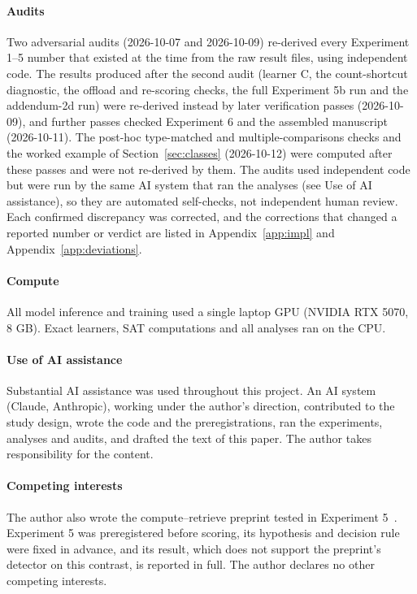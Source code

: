 \documentclass[11pt]{article}
\begin{document}
\paragraph{Audits}

Two adversarial audits (2026-10-07 and 2026-10-09) re-derived every Experiment 1--5 number that existed at the time from the raw result files, using independent code. The results produced after the second audit (learner C, the count-shortcut diagnostic, the offload and re-scoring checks, the full Experiment 5b run and the addendum-2d run) were re-derived instead by later verification passes (2026-10-09), and further passes checked Experiment 6 and the assembled manuscript (2026-10-11). The post-hoc type-matched and multiple-comparisons checks and the worked example of Section~\ref{sec:classes} (2026-10-12) were computed after these passes and were not re-derived by them. The audits used independent code but were run by the same AI system that ran the analyses (see Use of AI assistance), so they are automated self-checks, not independent human review. Each confirmed discrepancy was corrected, and the corrections that changed a reported number or verdict are listed in Appendix~\ref{app:impl} and Appendix~\ref{app:deviations}.

\paragraph{Compute}

All model inference and training used a single laptop GPU (NVIDIA RTX 5070, 8 GB). Exact learners, SAT computations and all analyses ran on the CPU.

\paragraph{Use of AI assistance}

Substantial AI assistance was used throughout this project. An AI system (Claude, Anthropic), working under the author's direction, contributed to the study design, wrote the code and the preregistrations, ran the experiments, analyses and audits, and drafted the text of this paper. The author takes responsibility for the content.

\paragraph{Competing interests}

The author also wrote the compute--retrieve preprint tested in Experiment 5~\cite{ramdan2026cr}. Experiment 5 was preregistered before scoring, its hypothesis and decision rule were fixed in advance, and its result, which does not support the preprint's detector on this contrast, is reported in full. The author declares no other competing interests.
\end{document}
